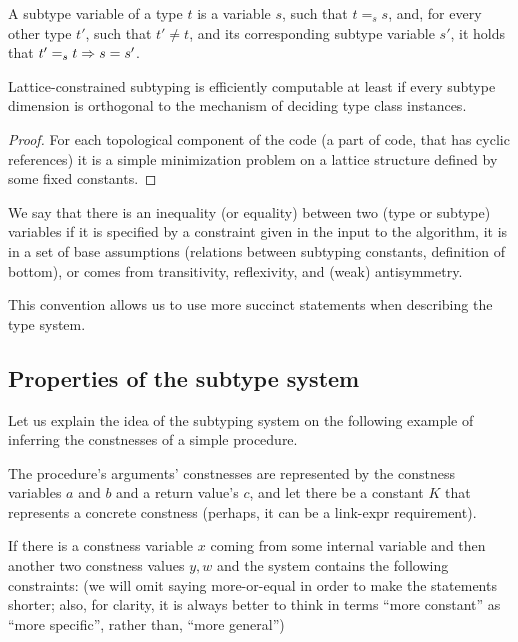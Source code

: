 \begin{defn}
    A subtype variable of a type $t$ is a variable $s$, such that $t =_s s$, and, for every other type $t'$, such that $t' \neq t$, and its corresponding subtype variable $s'$, it holds that $t' =_s t \Rightarrow s = s'$.
\end{defn}

\begin{lemma}
    Lattice-constrained subtyping is efficiently computable at least if every subtype dimension is orthogonal to the mechanism of deciding type class instances.
\end{lemma}

\begin{proof}
    For each topological component of the code (a part of code, that has cyclic references) it is a simple minimization problem on a lattice structure defined by some fixed constants.
\end{proof}

\begin{remark}
    We say that there is an inequality (or equality) between two (type or subtype) variables if it is specified by a constraint given in the input to the algorithm, it is in a set of base assumptions (relations between subtyping constants, definition of bottom), or comes from transitivity, reflexivity, and (weak) antisymmetry.

    This convention allows us to use more succinct statements when describing the type system.
\end{remark}

\subsection{Properties of the subtype system}
\label{subtyping-idea}

Let us explain the idea of the subtyping system on the following example of inferring the constnesses of a simple procedure.

The procedure's arguments' constnesses are represented by the constness variables $a$ and $b$ and a return value's $c$, and let there be a constant $K$ that represents a concrete constness (perhaps, it can be a link-expr requirement).

If there is a constness variable $x$ coming from some internal variable and then another two constness values $y, w$ and the system contains the following constraints: (we will omit saying more-or-equal in order to make the statements shorter; also, for clarity, it is always better to think in terms ``more constant'' as ``more specific'', rather than, ``more general'')

